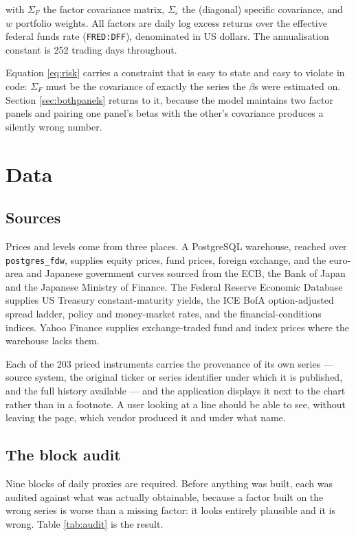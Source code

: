 \documentclass[11pt,a4paper]{article}
\newcommand{\code}[1]{\texttt{\small #1}}
\begin{document}
with $\Sigma_F$ the factor covariance matrix, $\Sigma_\varepsilon$ the (diagonal)
specific covariance, and $w$ portfolio weights. All factors are daily log excess
returns over the effective federal funds rate (\code{FRED:DFF}), denominated in US
dollars. The annualisation constant is 252 trading days throughout.

Equation \eqref{eq:risk} carries a constraint that is easy to state and easy to
violate in code: $\Sigma_F$ must be the covariance of exactly the series the $\beta$s
were estimated on. Section \ref{sec:bothpanels} returns to it, because the model
maintains two factor panels and pairing one panel's betas with the other's covariance
produces a silently wrong number.

\section{Data}
\label{sec:data}

\subsection{Sources}

Prices and levels come from three places. A PostgreSQL warehouse, reached over
\code{postgres\_fdw}, supplies equity prices, fund prices, foreign exchange, and the
euro-area and Japanese government curves sourced from the ECB, the Bank of Japan and
the Japanese Ministry of Finance. The Federal Reserve Economic Database supplies US
Treasury constant-maturity yields, the ICE BofA option-adjusted spread ladder, policy
and money-market rates, and the financial-conditions indices. Yahoo Finance supplies
exchange-traded fund and index prices where the warehouse lacks them.

Each of the 203 priced instruments carries the provenance of its own series --- source
system, the original ticker or series identifier under which it is published, and the
full history available --- and the application displays it next to the chart rather
than in a footnote. A user looking at a line should be able to see, without leaving
the page, which vendor produced it and under what name.

\subsection{The block audit}

Nine blocks of daily proxies are required. Before anything was built, each was
audited against what was actually obtainable, because a factor built on the wrong
series is worse than a missing factor: it looks entirely plausible and it is wrong.
Table \ref{tab:audit} is the result.
\end{document}
